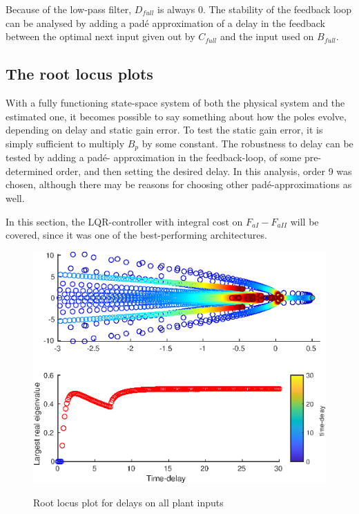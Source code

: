 Because of the low-pass filter, $D_{full}$ is always 0. The stability of the feedback loop can be analysed by adding a padé approximation of a delay in the feedback between the optimal next input given out by $C_{full}$ and the input used on $B_{full}$. 
\noindent

\subsection{The root locus plots}
With a fully functioning state-space system of both the physical system and the estimated one, it becomes possible to say something about how the poles evolve, depending on delay and static gain error. To test the static gain error, it is simply sufficient to multiply $B_p$ 
by some constant. The robustness to delay can be tested by adding a padé- approximation in the feedback-loop, of some pre-determined order, and then setting the desired delay. In this analysis, order 9 was chosen, although there may be reasons for choosing other padé-approximations as well. 

In this section, the LQR-controller with integral cost on $F_{aI} - F_{aII}$ will be covered, since it was one of the best-performing architectures. 

\begin{figure}
    \includegraphics[width=\textwidth]{img/Fig_dump/tau_root_locusLQRDiffIntegralAgnostic_paramsfor_all.eps}
    \label{fig:LQR_root_locus_full_delay}
    \caption{Root locus plot for delays on all plant inputs}
\end{figure}

